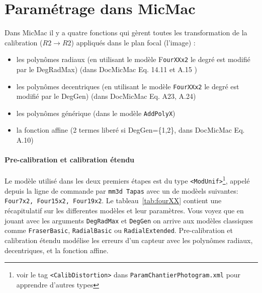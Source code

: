 \documentclass[11pt,a4paper,oneside]{book}
\begin{document}

\section{Paramétrage dans MicMac}
%
Dans MicMac il y a quatre fonctions qui gèrent toutes les transformation de la calibration ($R2 \rightarrow R2$) appliqués dans le plan focal (l'image) :
\begin{itemize}
\item les polynômes radiaux (en utilisant le modèle {F\tt ourXXx2} le degré est modifié par le DegRadMax) (dans DocMicMac Eq. 14.11 et A.15 )
\item les polynômes decentriques (en utilisant le modèle { \tt FourXXx2} le degré est modifié par le DegGen) (dans DocMicMac Eq. A23, A.24) 
\item les polynômes générique (dans le modèle {\tt AddPolyX})
\item la fonction affine (2 termes liberé si DegGen=\{1,2\}, dans DocMicMac Eq. A.10)
\end{itemize}
%
\paragraph{Pre-calibration et calibration étendu}
%
Le modèle utilisé dans les deux premiers étapes est du type {\tt <ModUnif>}\footnote{voir le tag {\tt <CalibDistortion>} dans {\tt ParamChantierPhotogram.xml} pour apprendre d'autres types}, appelé depuis la ligne de commande par {\tt mm3d Tapas} avec un de modèels suivantes: {\tt Four7x2, Four15x2, Four19x2}. Le tableau~\ref{tab:fourXX} contient une récapitulatif sur les differentes modèles et leur paramètres. Vous voyez que en jouant avec les arguments {\tt DegRadMax} et {\tt DegGen} on arrive aux modèles classiques comme {\tt FraserBasic}, {\tt RadialBasic} ou {\tt  RadialExtended}. Pre-calibration et calibration étendu modélise les erreurs d'un capteur avec les polynômes radiaux, decentriques, et la fonction affine.
%
\end{document}
